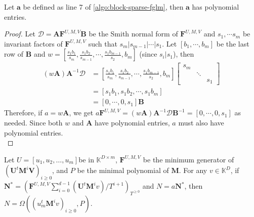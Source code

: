 \documentclass[12pt]{article}
\def\K {\ensuremath{\mathbb{K}}}
\def\K{\mathbb{K}}
\def\mA{\mathbf{A}}
\def\mB{\mathbf{B}}
\def\mF{\mathbf{F}}
\def\mM{\mathbf{M}}
\def\mN{\mathbf{N}}
\def\mU{\mathbf{U}}
\def\mV{\mathbf{V}}
\begin{document}
\begin{lemma}\label{utilde}
	Let $\textbf{a}$ be defined as line 7 of \cref{algo:block-sparse-fglm}, 
	then $\textbf{a}$ has polynomial entries.
\end{lemma}

\begin{proof}
	Let $\mathscr{D} = \mA\mF^{U,M,V}\mB$ be the Smith normal form of $\mF^{U,M,V}$ and $s_1, \cdots s_m$ be
	invariant factors of $\mF^{U,M,V}$ such that 
	$s_m | s_{m-1} | \cdots | s_1$.
	Let $[b_1,\cdots,b_m]$ be the last row of $\mB$ and 
	$w = [\frac{s_1b_1}{s_m},\frac{s_1b_2}{s_{m-1}},\cdots,\frac{s_1b_{m-1}}{s_2},b_m]$ (since $s_i | s_1$), then
	\begin{align*}
	(w \mA) \mA^{-1} \mathscr{D} &=  [\frac{s_1b_1}{s_m},\frac{s_1b_2}{s_{m-1}},\cdots,\frac{s_1b_{m-1}}{s_2},b_m]
	\begin{bmatrix}
	s_m &        & \\
	& \ddots & \\
	&        & s_1
	\end{bmatrix}\\
	&= [s_1b_1, s_1b_2, \cdots, s_1b_m]\\
	&= [0,\cdots,0,s_1] \mB
	\end{align*}
	Therefore, if $a = w \mA$, we get
	$ a \mF^{U,M,V} = (w \mA) \mA^{-1} \mathscr{D} \mB^{-1} = 
	[0,\cdots,0,s_1]$ as needed. Since both $w$ and $\mA$ have polynomial
	entries, $a$ must also have polynomial entries.\\
\end{proof}

\begin{theorem}
	 Let $U = [u_1,u_2,\dots,u_m]$be in $\K^{D\times m}$,
	 $\mF^{U,M,V}$ be the minimum generator of $(\mU^t \mM^i \mV)_{i\ge0}$,
	 and $P$ be the minimal polynomial of $\mM$. For any 
	 $v \in \K^{D}$, if\\ 
	 $\mN^* = (\mF^{U,M,V}\sum_{i=0}^{d-1} (\mU^t \mM^i v)/T^{i+1})_{T^{\ge0}}$ 
	 and $N = a\mN^*$,
	 then $N = \Omega((u_m^t \mM^i v)_{i\ge0},P)$.
	 \label{theorem:anyv}
\end{theorem}
\end{document}
